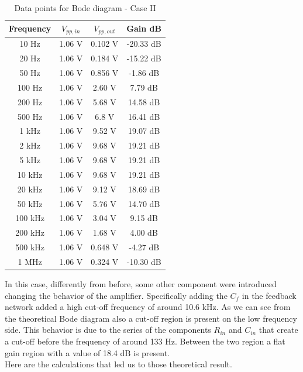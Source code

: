 \documentclass[../main.tex]{subfiles}
\begin{document}
\begin{table}[h!]
\centering	

\begin{tabular}{cccc}
\textbf{Frequency} & \textbf{$V_{pp,in}$} & \textbf{$V_{pp,out}$}  & \textbf{Gain dB} \\
\hline
 10 Hz & 1.06 V & 0.102 V & -20.33 dB \\
 \hline
 20 Hz & 1.06 V & 0.184 V &  -15.22 dB \\
 \hline
 50 Hz & 1.06 V & 0.856 V & -1.86 dB \\
 \hline
 100 Hz & 1.06 V & 2.60 V & 7.79 dB \\
 \hline
 200 Hz & 1.06 V & 5.68 V & 14.58 dB \\
 \hline
 500 Hz & 1.06 V & 6.8 V & 16.41 dB \\
 \hline
 1 kHz & 1.06 V & 9.52 V &  19.07 dB \\
 \hline
 2 kHz & 1.06 V & 9.68 V &  19.21 dB \\
 \hline
 5 kHz & 1.06 V & 9.68 V & 19.21 dB \\
 \hline
 10 kHz & 1.06 V & 9.68 V & 19.21 dB \\
 \hline
 20 kHz & 1.06  V & 9.12 V & 18.69 dB \\
 \hline
 50 kHz & 1.06  V & 5.76 V & 14.70  dB \\
 \hline
 100 kHz & 1.06 V & 3.04 V & 9.15 dB \\
 \hline
 200 kHz & 1.06  V & 1.68 V & 4.00 dB \\
 \hline
 500 kHz & 1.06 V & 0.648 V & -4.27 dB \\
 \hline
 1 MHz & 1.06 V & 0.324 V & -10.30 dB \\

\end{tabular}
\caption*{Data points for Bode diagram - Case II}
\end{table}

In this case, differently from before, some other component were introduced changing the behavior of the amplifier.
Specifically adding the $C_f$ in the feedback network added a high cut-off frequency of around 10.6 kHz. As we can see from the theoretical Bode diagram also a cut-off region is present on the low frequency side. This behavior is due to the series of the components $R_{in}$ and $C_{in}$ that create a cut-off before the frequency of around 133 Hz. Between the two region a flat gain region with a value of 18.4 dB is present.\\

Here are the calculations that led us to those theoretical result.\\
\end{document}
